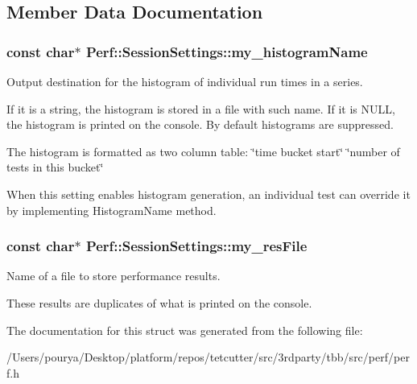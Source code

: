 \subsection{Member Data Documentation}
\hypertarget{structPerf_1_1SessionSettings_a48903a128e21238cf885e2766e2cb8bc}{}
\subsubsection[{my\+\_\+histogram\+Name}]{\setlength{\rightskip}{0pt plus 5cm}const char$\ast$ Perf\+::\+Session\+Settings\+::my\+\_\+histogram\+Name}\label{structPerf_1_1SessionSettings_a48903a128e21238cf885e2766e2cb8bc}


Output destination for the histogram of individual run times in a series. 

If it is a string, the histogram is stored in a file with such name. If it is N\+U\+L\+L, the histogram is printed on the console. By default histograms are suppressed.

The histogram is formatted as two column table\+: \char`\"{}time bucket start\char`\"{} \char`\"{}number of tests in this bucket\char`\"{}

When this setting enables histogram generation, an individual test can override it by implementing Histogram\+Name method. \hypertarget{structPerf_1_1SessionSettings_a428bb34d80e45daadf7f0d755d273572}{}
\subsubsection[{my\+\_\+res\+File}]{\setlength{\rightskip}{0pt plus 5cm}const char$\ast$ Perf\+::\+Session\+Settings\+::my\+\_\+res\+File}\label{structPerf_1_1SessionSettings_a428bb34d80e45daadf7f0d755d273572}


Name of a file to store performance results. 

These results are duplicates of what is printed on the console. 

The documentation for this struct was generated from the following file\+:\begin{DoxyCompactItemize}
\item 
/\+Users/pourya/\+Desktop/platform/repos/tetcutter/src/3rdparty/tbb/src/perf/perf.\+h\end{DoxyCompactItemize}

